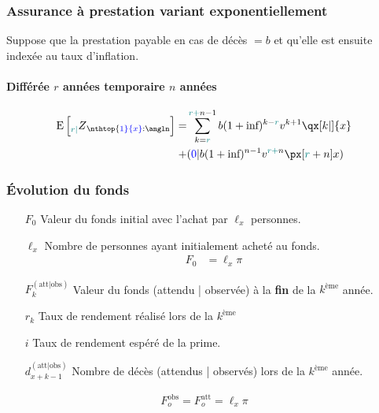 \documentclass[10pt, french]{article}
\begin{document}
\begin{multicols*}{3}
\subsubsection*{\textcolor{amber(sae/ece)}{Assurance à prestation variant exponentiellement}}

Suppose que la prestation payable en cas de décès $= b$ et qu'elle est ensuite indexée au taux d'inflation.

\paragraph{Différée $r$ années temporaire $n$ années}

\begin{align*}
	\esp{\prescript{}{\color{teal}r|}Z_{\nthtop{\color{blue}1}{x}:\angln}} = 
	&\sum\limits_{ k = {\color{teal}r }}^{{\color{teal} r + }n - 1} b (1 + \text{inf})^{k - {\color{teal}r }} v^{k + 1} \qx[k|]{x}  \\
	+ &({\color{blue}0}|b (1 + \text{inf})^{n - 1}v^{{\color{teal}r +}n} \px[ {\color{teal}r} +n ]{x})
\end{align*}

\subsubsection*{\textcolor{amber(sae/ece)}{Évolution du fonds}}

\begin{enumerate}
	\item[$F_0$] Valeur du fonds initial avec l'achat par $\ell_x$ personnes.
	\item[$\ell_x$] Nombre de personnes ayant initialement acheté au fonds.
	\begin{align*}
		F_0 &= \ell_x \pi 
	\end{align*}
	\item[$F_k^{(\text{att}|\text{obs})}$] Valeur du fonds (attendu | observée) à la \textbf{fin} de la $k^{\text{ème}}$ année.
	\item[$r_k$] Taux de rendement réalisé lors de la $k^{\text{ème}}$
	\item[$i$] Taux de rendement espéré de la prime. 
	\item[$d_{x + k - 1}^{(\text{att}|\text{obs})} $] Nombre de décès (attendus | observés) lors de la $k^{\text{ème}}$ année.
\end{enumerate}

\begin{align*}
	F_o^{\text{obs}} = F_o^{\text{att}} = \ell_x \pi 
\end{align*}


\end{multicols*}
\end{document}
